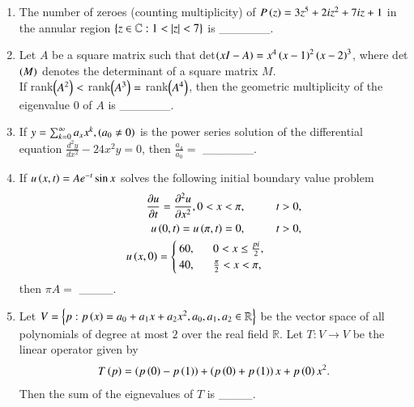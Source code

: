 \documentclass[journal]{IEEEtran}
\begin{document}
\begin{enumerate}
    \item The number of zeroes (counting multiplicity) of $P\left(z\right) = 3z^5 + 2iz^2 + 7iz + 1$ in the annular region $\left\{z \in \mathbb{C} : 1<\left\vert z\right\vert<7\right\}$ is \_\_\_\_\_\_.

    \item Let $A$ be a square matrix such that det$\left(xI - A\right) = x^4\left(x-1\right)^2 \left(x-2\right)^3$, where det$\left(M\right)$ denotes the determinant of a square matrix $M$. \\ If rank$\left(A^2\right) <$ rank$\left(A^3\right)=$ rank$\left(A^4\right)$, then the geometric multiplicity of the eigenvalue $0$ of $A$ is \_\_\_\_\_\_.

    \item If $y = \sum_{k=0}^{\infty} a_x x^k, \left(a_0 \neq 0\right)$ is the power series solution of the differential equation $\frac{d^2y}{dx^2} - 24x^2y = 0$, then $\frac{a_4}{a_0} =$ \_\_\_\_\_\_.

    \item If $u\left(x,t\right) = A e^{-t} \sin x$ solves the following initial boundary value problem
        \begin{align*}
            \frac{\partial u}{\partial t} = \frac{\partial ^2 u}{\partial x^2}, 0<x<\pi,  \hspace{1cm} &t>0,\\
            u\left(0,t\right) = u\left(\pi,t\right) = 0, \hspace{1cm} &t>0,\\
            u\left(x,0\right) = 
                \begin{cases}
                    60,\, \hspace{0.5cm} 0<x \leq \frac{pi}{2}, \\
                    40,\, \hspace{0.5cm} \frac{\pi}{2} < x < \pi,
                \end{cases}
        \end{align*}
        then $\pi A =$ \_\_\_\_.
        
    \item Let $V = \left\{p : p\left(x\right) = a_0 + a_1 x + a_2 x^2, a_0, a_1, a_2 \in \mathbb{R}\right\}$ be the vector space of all polynomials of degree at most $2$ over the real field $\mathbb{R}$. Let $T:V \rightarrow V$ be the linear operator given by
        \begin{align*}
            T\left(p\right) = \left(p\left(0\right) - p\left(1\right)\right) + \left(p\left(0\right) + p\left(1\right)\right)x + p\left(0\right)x^2.
        \end{align*}
        Then the sum of the eignevalues of $T$ is \_\_\_\_.


\end{enumerate}
\end{document}
